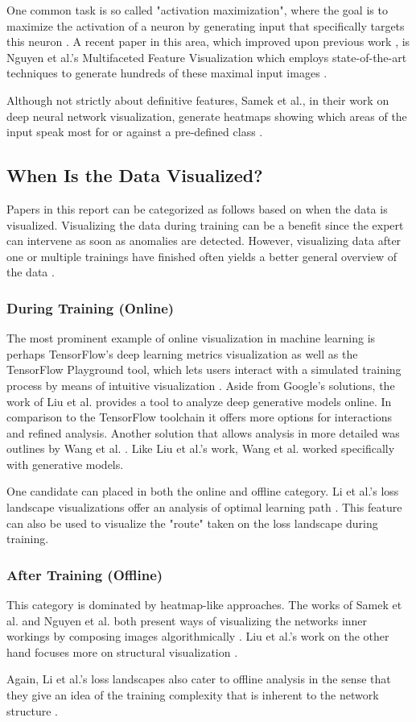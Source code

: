 \documentclass{acmsiggraph}               %
\begin{document}
One common task is so called "activation maximization", where the goal is to maximize the activation of a neuron by generating input that specifically targets this neuron \cite{Hohman2018}. A recent paper in this area, which improved upon previous work \cite{Erhan2009}, is Nguyen et al.'s Multifaceted Feature Visualization which employs state-of-the-art techniques to generate hundreds of these maximal input images \cite{Hohman2018,Nguyen2016}. 

Although not strictly about definitive features, Samek et al., in their work on deep neural network visualization, generate heatmaps showing which areas of the input speak most for or against a pre-defined class \cite{Samek2017}.

\subsection{When Is the Data Visualized?}
Papers in this report can be categorized as follows based on when the data is visualized. Visualizing the data during training can be a benefit since the expert can intervene as soon as anomalies are detected. However, visualizing data after one or multiple trainings have finished often yields a better general overview of the data \cite{Hohman2018}.
\subsubsection{During Training (Online)}
The most prominent example of online visualization in machine learning is perhaps TensorFlow's deep learning metrics visualization \cite{Wongsuphasawat2018} as well as the TensorFlow Playground tool, which lets users interact with a simulated training process by means of intuitive visualization \cite{Smilkov2017}.
Aside from Google's solutions, the work of Liu et al. \cite{Liu2018} provides a tool to analyze deep generative models online. In comparison to the TensorFlow toolchain it offers more options for interactions and refined analysis. Another solution that allows analysis in more detailed was outlines by Wang et al. \cite{Wang}. Like Liu et al.'s work, Wang et al. worked specifically with generative models.

One candidate can placed in both the online and offline category. Li et al.'s loss landscape visualizations offer an analysis of optimal learning path \cite{Li2017}. This feature can also be used to visualize the "route" taken on the loss landscape during training.

\subsubsection{After Training (Offline)}
This category is dominated by heatmap-like approaches. The works of Samek et al. and Nguyen et al. both present ways of visualizing the networks inner workings by composing images algorithmically \cite{Samek2017,Nguyen2016}. 
Liu et al.'s work on the other hand focuses more on structural visualization \cite{Liu2016}.

Again, Li et al.'s loss landscapes also cater to offline analysis in the sense that they give an idea of the training complexity that is inherent to the network structure \cite{Li2017}.


\nocite{*}

\end{document}
